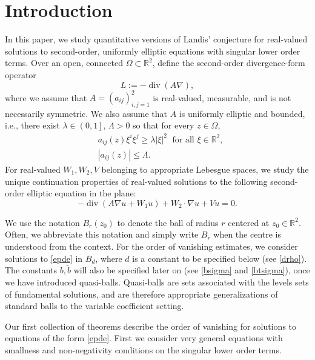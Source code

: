\documentclass[12pt,reqno]{amsart}
\theoremstyle{plain}
\theoremstyle{definition}
\DeclareMathOperator{\di}{div}
\newcommand{\la}{\lambda}
\newcommand{\La}{\Lambda}
\newcommand{\Om}{\Omega}
\newcommand{\su}{\subset}
\newcommand{\gr}{\nabla}
\newcommand{\abs}[1]{\left\vert#1\right\vert}
\newcommand{\pr}[1]{\left( #1 \right) }
\newcommand{\pb}[1]{\left( #1 \right] }
\newcommand{\R}{\ensuremath{\mathbb{R}}}
\begin{document}
\maketitle

\section{Introduction}

In this paper, we study quantitative versions of Landis' conjecture for real-valued solutions to second-order, uniformly elliptic equations with singular lower order terms.
Over an open, connected $\Om \su \R^2$, define the second-order divergence-form operator
$$L :=  -\di\pr{A \gr },$$
where we assume that $A = \pr{a_{ij}}_{i, j = 1}^2$ is real-valued, measurable, and is not necessarily symmetric.
We also assume that $A$ is uniformly elliptic and bounded, i.e., there exist $\la \in \pb{0, 1}$, $\La > 0$ so that for every $z \in \Om$,
\begin{align}
&a_{ij}\pr{z} \xi^i \xi^j \ge \la  \abs{\xi}^2 \; \text{ for all } \xi \in \R^2,\label{ellip} \\
&\abs{a_{ij}\pr{z}} \le \La.  \label{ABd}
\end{align}
%
For real-valued $W_1, W_2, V$ belonging to appropriate Lebesgue spaces, %
we study the unique continuation properties of real-valued solutions to the following second-order elliptic equation in the plane:
\begin{equation}
- \di\pr{A \gr u + W_1 u} + W_2 \cdot \gr u + V u = 0.
\label{epde}
\end{equation}

We use the notation $B_r\pr{z_0}$ to denote the ball of radius $r$ centered at $z_0 \in \R^2$.
Often, we abbreviate this notation and simply write $B_r$ when the centre is understood from the context.
For the order of vanishing estimates, we consider solutions to \eqref{epde} in $B_d$, where $d$ is a constant to be specified below (see \eqref{drho}).
The constants $b, \tilde b$ will also be specified later on (see \eqref{bsigma} and \eqref{btsigma}), once we have introduced quasi-balls.
Quasi-balls are sets associated with the levels sets of fundamental solutions, and are therefore appropriate generalizations of standard balls to the variable coefficient setting.

Our first collection of theorems describe the order of vanishing for solutions to equations of the form \eqref{epde}.
First we consider very general equations with smallness and non-negativity conditions on the singular lower order terms.
\end{document}
